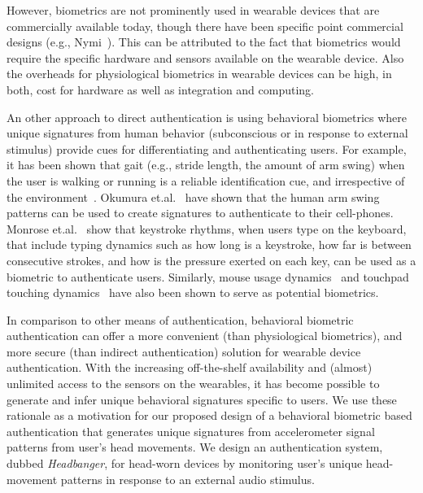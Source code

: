 However, biometrics are
not prominently used in wearable devices that are commercially available 
today, though
there have been specific point commercial designs (e.g., Nymi~\cite{nymi}). This can be attributed to the
fact that biometrics would require the specific hardware and sensors available on
the wearable device. Also the overheads for physiological biometrics in
wearable devices can be high, in both, cost for hardware as well as
integration and computing.


An other approach to direct authentication is using behavioral biometrics
where unique signatures from human behavior (subconscious
or in response to external stimulus) provide cues for differentiating and
authenticating users. For example, it has been shown that gait (e.g.,
stride length, the
amount of arm swing) when the user is walking or
running is a reliable identification cue, and irrespective of the
environment~\cite{stevenage1999visual}. Okumura et.al.~\cite{okumura2006study}
have shown that the human arm swing patterns can be used to create signatures
to authenticate to their cell-phones. Monrose
et.al.~\cite{monrose2000keystroke} show that keystroke rhythms, when
users type on the keyboard, that include typing dynamics such as how
long is a keystroke, how far is between consecutive strokes, and how is the
pressure exerted on each key, can be used as a biometric to authenticate
users. Similarly, mouse usage dynamics~\cite{jorgensen2011mouse} and touchpad
touching dynamics~\cite{bo2013silentsense,de2012touch} have also been shown to
serve as potential biometrics.

In comparison to other means of authentication, behavioral biometric
authentication can offer a more convenient (than physiological biometrics),
and more secure (than indirect authentication) solution for wearable device
authentication. With the increasing off-the-shelf
availability and (almost) unlimited access to the sensors on the wearables, it
has become possible to generate and infer unique behavioral signatures
specific to users. We use these rationale as a motivation for our proposed
design of a behavioral biometric based authentication that generates unique
signatures from accelerometer signal patterns from user's head movements.
We design an authentication system, dubbed {\em Headbanger}, for head-worn
devices by monitoring user's unique head-movement patterns in response to an
external audio stimulus.

